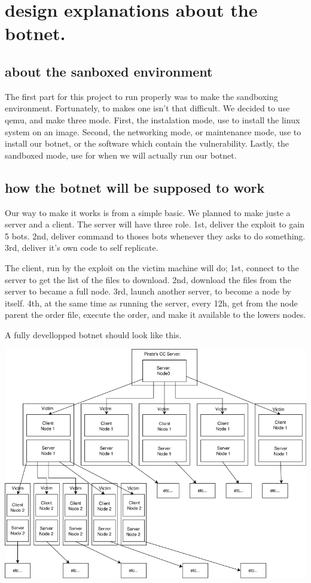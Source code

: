 \documentclass[../main.tex]{subfiles}
\begin{document}
    \vspace{10pt}

    \section{design explanations about the botnet.}

    \subsection{about the sanboxed environment}

    The first part for this project to run properly was to make the sandboxing environment.
    Fortunately, to makes one isn't that difficult. 
    We decided to use qemu, and make three mode.
    First, the instalation mode, use to install the linux system on an image.
    Second, the networking mode, or maintenance mode, use to install our botnet, or the software which contain the vulnerability.
    Lastly, the sandboxed mode, use for when we will actually run our botnet.

    \vspace{10pt}

    \subsection{how the botnet will be supposed to work}

    Our way to make it works is from a simple basic.
    We planned to make juste a server and a client.
    The server will have three role.
    1st, deliver the exploit to gain 5 bots.
    2nd, deliver command to thoses bots whenever they asks to do something.
    3rd, deliver it's own code to self replicate.

    The client, run by the exploit on the victim machine will do;
    1st, connect to the server to get the list of the files to download.
    2nd, download the files from the server to became a full node.
    3rd, launch another server, to become a node by itself.
    4th, at the same time as running the server, every 12h, get from the node parent the order file, execute the order, and make it available to the lowers nodes.

    A fully devellopped botnet should look like this.

    \includegraphics[width=450pt]{botnet.png}
\end{document}
